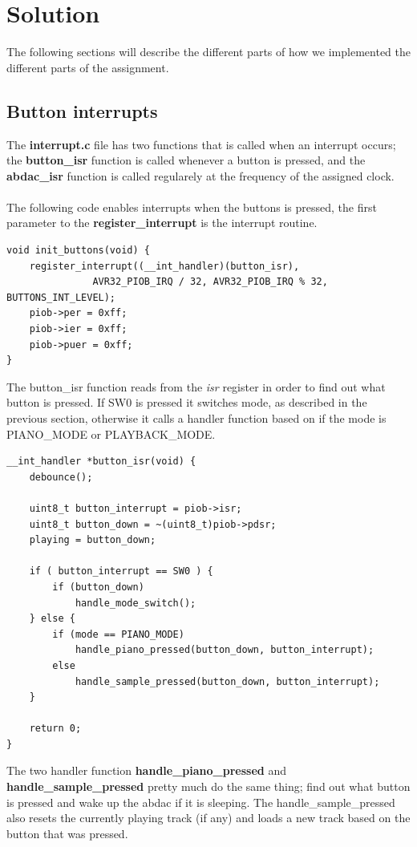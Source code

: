 \section{Solution}
The following sections will describe the different parts of how we implemented the 
different parts of the assignment.
\subsection{Button interrupts}
The \textbf{interrupt.c} file has two functions that is called when an interrupt occurs; 
the \textbf{button\_isr} function is called whenever a button is pressed, and 
the \textbf{abdac\_isr} function is called regularely at the frequency of the assigned clock.\\
\\
The following code enables interrupts when the buttons is pressed, the first parameter to
the \textbf{register\_interrupt} is the interrupt routine. \\
\begin{lstlisting}
void init_buttons(void) {
	register_interrupt((__int_handler)(button_isr),
			   AVR32_PIOB_IRQ / 32, AVR32_PIOB_IRQ % 32, BUTTONS_INT_LEVEL);
	piob->per = 0xff;
	piob->ier = 0xff;
	piob->puer = 0xff;
}
\end{lstlisting}
The button\_isr function reads from the \textit{isr} register in order to find out what button
is pressed. If SW0 is pressed it switches mode, as described in the previous section, 
otherwise it calls a handler function based on if the mode is PIANO\_MODE or PLAYBACK\_MODE.
\begin{lstlisting}
__int_handler *button_isr(void) {
	debounce();

	uint8_t button_interrupt = piob->isr;
	uint8_t button_down = ~(uint8_t)piob->pdsr;
	playing = button_down;

	if ( button_interrupt == SW0 ) {
		if (button_down)
			handle_mode_switch();
	} else {
		if (mode == PIANO_MODE)
			handle_piano_pressed(button_down, button_interrupt);
		else
			handle_sample_pressed(button_down, button_interrupt);
	}

	return 0;
}
\end{lstlisting}
The two handler function \textbf{handle\_piano\_pressed} and \textbf{handle\_sample\_pressed} 
pretty much do the same thing; find out what button is pressed and
wake up the abdac if it is sleeping. The handle\_sample\_pressed also resets the currently
playing track (if any) and loads a new track based on the button that was pressed.

